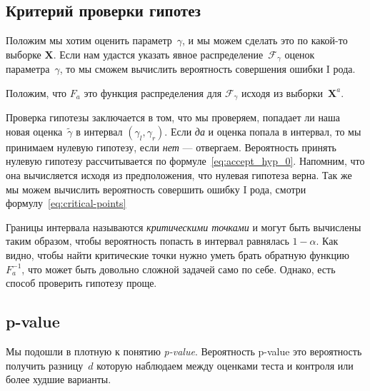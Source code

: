 \documentclass[../handbook.tex]{subfiles}
\begin{document}
\subsection{Критерий проверки гипотез}
Положим мы хотим оценить параметр~$\gamma$, и мы можем сделать это по какой-то
выборке $\mathbf{X}$. Если нам удастся указать явное распределение~$\mathcal
F_\gamma$ оценок параметра~$\gamma$, то мы сможем вычислить вероятность совершения ошибки I рода.

Положим, что $F_a$ это функция распределения для $\mathcal F_\gamma$ исходя
из выборки~$\mathbf X^a$.

Проверка гипотезы заключается в том, что мы проверяем, попадает ли наша новая
оценка~$\tilde\gamma$ в интервал $(\gamma_l, \gamma_r)$. Если \emph{да} и
оценка попала в интервал, то мы принимаем нулевую гипотезу, если \emph{нет} ---
отвергаем. Вероятность принять нулевую гипотезу рассчитывается по
формуле~\eqref{eq:accept_hyp_0}. Напомним, что она вычисляется исходя из
предположения, что нулевая гипотеза верна. Так же мы можем вычислить
вероятность совершить ошибку I рода, смотри формулу~\eqref{eq:critical-points} 

Границы интервала называются \emph{критическими точками} и могут быть вычислены таким образом, чтобы вероятность попасть в интервал равнялась $1-\alpha$. Как видно, чтобы найти критические точки нужно уметь брать обратную функцию $F_a^{-1}$, что может быть довольно сложной задачей само по себе. Однако, есть способ проверить гипотезу проще.

\subsection{p-value}
Мы подошли в плотную к понятию \emph{p-value}. Вероятность p-value это
вероятность получить разницу~$d$ которую наблюдаем между оценками теста и
контроля или более худшие варианты. 
\end{document}
